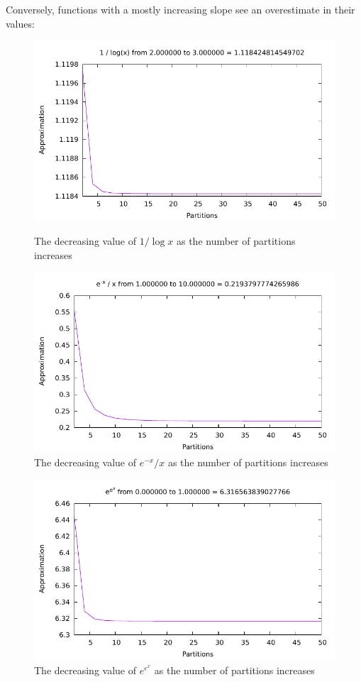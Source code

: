 \documentclass[12pt]{article}
\begin{document}
Conversely, functions with a mostly increasing slope see an overestimate in their values:
\begin{figure}\begin{centering}
\includegraphics{integrate1.pdf}\caption{The decreasing value of $1 / \log{x}$ as the number of partitions increases}
\includegraphics{integrate7.pdf}\caption{The decreasing value of $e^{-x}/x$ as the number of partitions increases}
\end{centering}\end{figure}
\newpage
\begin{figure}\begin{centering}
\includegraphics{integrate8.pdf}\caption{The decreasing value of $e^{e^x}$ as the number of partitions increases}
\end{centering}\end{figure}
\end{document}
